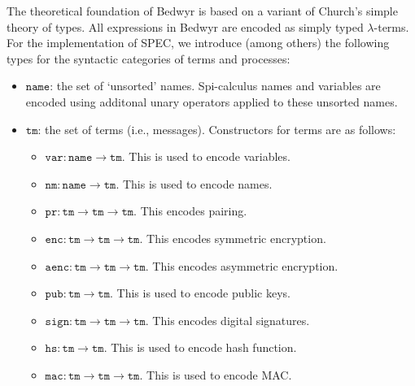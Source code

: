 \documentclass{article}
\newcommand\obj[1]{\texttt{#1}}
\begin{document}
The theoretical foundation of Bedwyr is based on a variant of Church's simple theory of
types. All expressions in Bedwyr are encoded as simply typed $\lambda$-terms. 
For the implementation of SPEC, we introduce (among others) the following types for
the syntactic categories of terms and processes:
\begin{itemize}
\item $\obj{name}$: the set of `unsorted' names. Spi-calculus names and variables
are encoded using additonal unary operators applied to these unsorted names.

\item $\obj{tm}$: the set of terms (i.e., messages). Constructors for terms are as follows:
\begin{itemize}
\item $\obj{var} : \obj{name} \to \obj{tm}$. This is used to encode variables. 
\item $\obj{nm} : \obj{name} \to \obj{tm}$. This is used to encode names. 
\item $\obj{pr} : \obj{tm} \to \obj{tm} \to \obj{tm}$. This encodes pairing.
\item $\obj{enc} : \obj{tm} \to \obj{tm} \to \obj{tm}$. This encodes symmetric encryption.
\item $\obj{aenc} : \obj{tm} \to \obj{tm} \to \obj{tm}$. This encodes asymmetric encryption.
\item $\obj{pub} : \obj{tm} \to \obj{tm}$. This is used to encode public keys.
\item $\obj{sign} : \obj{tm} \to \obj{tm} \to \obj{tm}$. This encodes digital signatures.
\item $\obj{hs} : \obj{tm} \to \obj{tm}$. This is used to encode hash function.
\item $\obj{mac} : \obj{tm} \to \obj{tm} \to \obj{tm}$. This is used to encode MAC.
\end{itemize}


\end{itemize}
\end{document}
